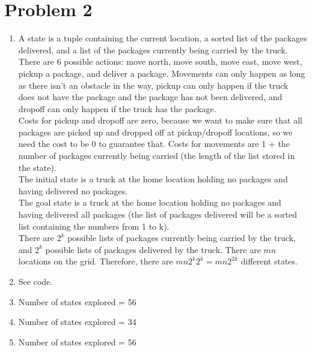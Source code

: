 \documentclass[12pt]{article}
\begin{document}
\section*{Problem 2}

\begin{enumerate}[label=(\alph*)]
  \item A state is a tuple containing the current location, a sorted list of the packages delivered, and a list of the packages currently being carried by the truck.\\
  There are 6 possible actions: move north, move south, move east, move west, pickup a package, and deliver a package. Movements can only happen as long as there isn't an obstacle in the way, pickup can only happen if the truck does not have the package and the package has not been delivered, and dropoff can only happen if the truck has the package.\\
  Costs for pickup and dropoff are zero, because we want to make sure that all packages are picked up and dropped off at pickup/dropoff locations, so we need the cost to be 0 to guarantee that. Costs for movements are 1 + the number of packages currently being carried (the length of the list stored in the state).\\
  The initial state is a truck at the home location holding no packages and having delivered no packages.\\
  The goal state is a truck at the home location holding no packages and having delivered all packages (the list of packages delivered will be a sorted list containing the numbers from 1 to k).\\
  There are $2^k$ possible lists of packages currently being carried by the truck, and $2^k$ possible lists of packages delivered by the truck. There are $mn$ locations on the grid. Therefore, there are $mn2^k2^k = mn2^{2k}$ different states.
  \item See code.
  \item Number of states explored = 56
  \item Number of states explored = 34
  \item Number of states explored = 56
\end{enumerate}
\end{document}
